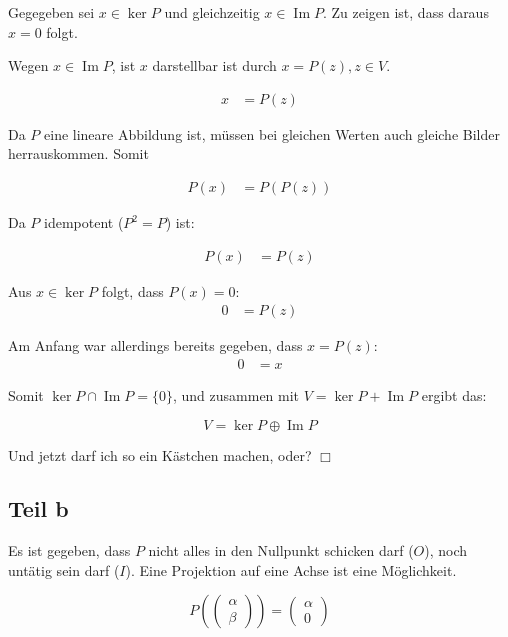 \documentclass[a4paper,german,12pt,smallheadings]{scrartcl}
\begin{document}
Gegegeben sei $x \in \ker P$ und gleichzeitig $x \in \operatorname{Im} P$. Zu
zeigen ist, dass daraus $x = 0$ folgt.

Wegen $x \in \operatorname{Im} P$, ist $x$ darstellbar ist durch $x =
P(z), z \in V$.

\begin{align*}
  x &= P(z)
\end{align*}

Da $P$ eine lineare Abbildung ist, müssen bei gleichen Werten auch gleiche
Bilder herrauskommen. Somit

\begin{align*}
  P(x) &= P(P(z))
\end{align*}

Da $P$ idempotent ($P^2 = P$) ist:

\begin{align*}
  P(x) &= P(z)
\end{align*}

Aus $x \in \ker P$ folgt, dass $P(x) = 0$:
\begin{align*}
  0 &= P(z)
\end{align*}

Am Anfang war allerdings bereits gegeben, dass $x = P(z)$:
\begin{align*}
  0 &= x
\end{align*}

Somit $\ker P \cap \operatorname{Im} P = \{0\}$, und zusammen mit $V = \ker P +
\operatorname{Im} P$ ergibt das:

\begin{equation}
  V = \ker P \oplus \operatorname{Im} P
\end{equation}

Und jetzt darf ich so ein Kästchen machen, oder? $\Box$

\subsection*{Teil b}

Es ist gegeben, dass $P$ nicht alles in den Nullpunkt schicken darf ($O$), noch
untätig sein darf ($I$). Eine Projektion auf eine Achse ist eine Möglichkeit.

\begin{equation} 
  P\left(\begin{pmatrix} \alpha \\ \beta \end{pmatrix}\right) =
    \begin{pmatrix}\alpha \\ 0\end{pmatrix}
\end{equation}
\end{document}
